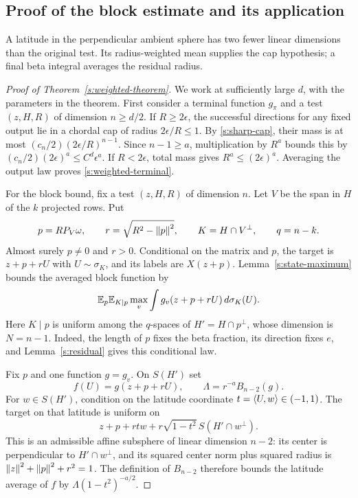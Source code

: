 \subsection{Proof of the block estimate and its application}

A latitude in the perpendicular ambient sphere has two fewer linear
dimensions than the original test. Its radius-weighted mean supplies the cap hypothesis;
a final beta integral averages the residual radius.

\begin{proof}[Proof of Theorem~\ref{s:weighted-theorem}]
We work at sufficiently large \(d\), with the parameters in the
theorem. First consider a terminal function \(g_\pi\) and a test
\((z,H,R)\) of dimension \(n\ge d/2\). If \(R\ge2\epsilon\), the
successful directions for any fixed output lie in a chordal cap of
radius \(2\epsilon/R\le1\). By \eqref{s:sharp-cap}, their mass is at
most \((c_n/2)(2\epsilon/R)^{n-1}\). Since \(n-1\ge a\),
multiplication by \(R^a\) bounds this by
\((c_n/2)(2\epsilon)^a\le C^d\epsilon^a\).
If \(R<2\epsilon\), total mass gives \(R^a\le(2\epsilon)^a\).
Averaging the output law proves \eqref{s:weighted-terminal}.

For the block bound, fix a test \((z,H,R)\) of dimension \(n\).
Let \(V\) be the span in \(H\) of the \(k\) projected rows. Put
\[
 p=R P_V\omega,\qquad r=\sqrt{R^2-\left\lVert p\right\rVert^2},\qquad
 K=H\cap V^\perp,\qquad q=n-k.
\]
Almost surely \(p\ne0\) and \(r>0\). Conditional on the matrix and
\(p\), the target is \(z+p+rU\) with \(U\sim\sigma_K\), and its
labels are \(X(z+p)\). Lemma~\ref{s:state-maximum} bounds the
averaged block function by
\begin{equation}\label{s:weighted-max}
 \mathbb E_p\mathbb E_{K\mid p}\max_v
       \int g_v(z+p+rU)\,d\sigma_K(U).
\end{equation}
Here \(K\mid p\) is uniform among the \(q\)-spaces of
\(H'=H\cap p^\perp\), whose dimension is \(N=n-1\).
Indeed, the length of \(p\) fixes the beta fraction, its direction
fixes \(e\), and Lemma~\ref{s:residual} gives this conditional law.

Fix \(p\) and one function \(g=g_v\). On \(S(H')\) set
\[
 f(U)=g(z+p+rU),\qquad \Lambda=r^{-a}B_{n-2}(g).
\]
For \(w\in S(H')\), condition on the latitude coordinate
\(t=\langle U,w\rangle\in(-1,1)\). The target on that latitude is uniform on
\[
 z+p+rtw+r\sqrt{1-t^2}\,S(H'\cap w^\perp).
\]
This is an admissible affine subsphere of linear dimension \(n-2\):
its center is perpendicular to \(H'\cap w^\perp\), and its squared
center norm plus squared radius is
\(\left\lVert z\right\rVert^2+\left\lVert p\right\rVert^2+r^2=1\). The definition of \(B_{n-2}\) therefore
bounds the latitude average of \(f\) by
\(\Lambda(1-t^2)^{-a/2}\).


\end{proof}
